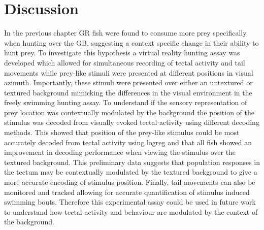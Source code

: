 \section{Discussion}
In the previous chapter GR fish were found to consume more prey specifically when hunting over the GB, suggesting a context specific change in their ability to hunt prey. To investigate this hypothesis a virtual reality hunting assay was developed which allowed for simultaneous recording of tectal activity and tail movements while prey-like stimuli were presented at different positions in visual azimuth. Importantly, these stimuli were presented over either an untextured or textured background mimicking the differences in the visual environment in the freely swimming hunting assay.  To understand if the sensory representation of prey location was contextually modulated by the background the position of the stimulus was decoded from visually evoked tectal activity using different decoding methods. This showed that position of the prey-like stimulus could be most accurately decoded from tectal activity using \gls{logreg} and that all fish showed an improvement in decoding performance when viewing the stimulus over the textured background. This preliminary data suggests that population responses in the tectum may be contextually modulated by the textured background to give a more accurate encoding of stimulus position. Finally, tail movements can also be monitored and tracked allowing for accurate quantification of stimulus induced swimming bouts. Therefore this experimental assay could be used in future work to understand how tectal activity and behaviour are modulated by the context of the background.

